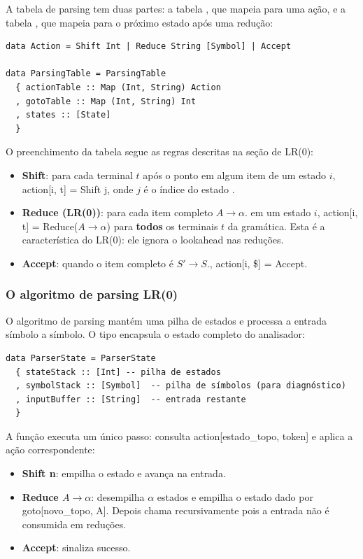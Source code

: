 A tabela de parsing tem duas partes: a tabela
, que mapeia
 para uma ação, e a
tabela , que mapeia
 para o próximo
estado após uma redução:

\begin{verbatim}
data Action = Shift Int | Reduce String [Symbol] | Accept

data ParsingTable = ParsingTable
  { actionTable :: Map (Int, String) Action
  , gotoTable :: Map (Int, String) Int
  , states :: [State]
  }
\end{verbatim}

O preenchimento da tabela segue as regras descritas na seção de LR(0):

\begin{itemize}
  \item
    \textbf{Shift}: para cada terminal \(t\) após o ponto em algum
    item de um estado \(i\), action[i, t] = Shift j, onde
    \(j\) é o índice do estado
    .
  \item
    \textbf{Reduce (LR(0))}: para cada item completo \(A \to \alpha
    .\) em um estado \(i\), action[i, t] =
    Reduce($A \to \alpha$) para \textbf{todos} os terminais \(t\) da
    gramática. Esta é a característica do LR(0): ele ignora o
    lookahead nas reduções.
  \item
    \textbf{Accept}: quando o item completo é \(S' \to S .\),
    action[i, \$] = Accept.
\end{itemize}

\subsubsection{O algoritmo de parsing LR(0)}

O algoritmo de parsing mantém uma pilha de estados e processa a
entrada símbolo a símbolo. O tipo
 encapsula o estado completo do analisador:

\begin{verbatim}
data ParserState = ParserState
  { stateStack :: [Int] -- pilha de estados
  , symbolStack :: [Symbol]  -- pilha de símbolos (para diagnóstico)
  , inputBuffer :: [String]  -- entrada restante
  }
\end{verbatim}

A função  executa um único passo:
consulta action[estado\_topo, token] e
aplica a ação correspondente:

\begin{itemize}
  \item
    \textbf{Shift n}: empilha o estado  e
    avança na entrada.
  \item
    \textbf{Reduce $A \to \alpha$}: desempilha $\alpha$
    estados e empilha o estado dado por
    goto[novo\_topo, A]. Depois chama
     recursivamente pois a entrada
    não é consumida em reduções.
  \item
    \textbf{Accept}: sinaliza sucesso.
\end{itemize}


